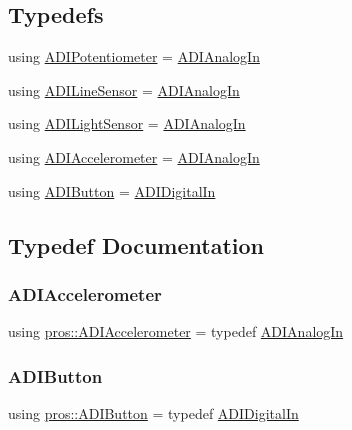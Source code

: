 \subsection*{Typedefs}
\begin{DoxyCompactItemize}
\item 
using \hyperlink{namespacepros_a49b07257293eca610437130d01c47b89}{A\+D\+I\+Potentiometer} = \hyperlink{classpros_1_1ADIAnalogIn}{A\+D\+I\+Analog\+In}
\item 
using \hyperlink{namespacepros_a70a7be425ae5e39c353db03e14d62e9a}{A\+D\+I\+Line\+Sensor} = \hyperlink{classpros_1_1ADIAnalogIn}{A\+D\+I\+Analog\+In}
\item 
using \hyperlink{namespacepros_a105b1224da9401cb8b6949713841fed7}{A\+D\+I\+Light\+Sensor} = \hyperlink{classpros_1_1ADIAnalogIn}{A\+D\+I\+Analog\+In}
\item 
using \hyperlink{namespacepros_afb12c694dcb91a1aa04a6ba7cfd9b6c0}{A\+D\+I\+Accelerometer} = \hyperlink{classpros_1_1ADIAnalogIn}{A\+D\+I\+Analog\+In}
\item 
using \hyperlink{namespacepros_a00d5ba20a966a15bf0276ffda24f2dcf}{A\+D\+I\+Button} = \hyperlink{classpros_1_1ADIDigitalIn}{A\+D\+I\+Digital\+In}
\end{DoxyCompactItemize}


\subsection{Typedef Documentation}
\mbox{\label{namespacepros_afb12c694dcb91a1aa04a6ba7cfd9b6c0}} 
\subsubsection{\texorpdfstring{A\+D\+I\+Accelerometer}{ADIAccelerometer}}
{\footnotesize\ttfamily using \hyperlink{namespacepros_afb12c694dcb91a1aa04a6ba7cfd9b6c0}{pros\+::\+A\+D\+I\+Accelerometer} = typedef \hyperlink{classpros_1_1ADIAnalogIn}{A\+D\+I\+Analog\+In}}

\mbox{\label{namespacepros_a00d5ba20a966a15bf0276ffda24f2dcf}} 
\subsubsection{\texorpdfstring{A\+D\+I\+Button}{ADIButton}}
{\footnotesize\ttfamily using \hyperlink{namespacepros_a00d5ba20a966a15bf0276ffda24f2dcf}{pros\+::\+A\+D\+I\+Button} = typedef \hyperlink{classpros_1_1ADIDigitalIn}{A\+D\+I\+Digital\+In}}

